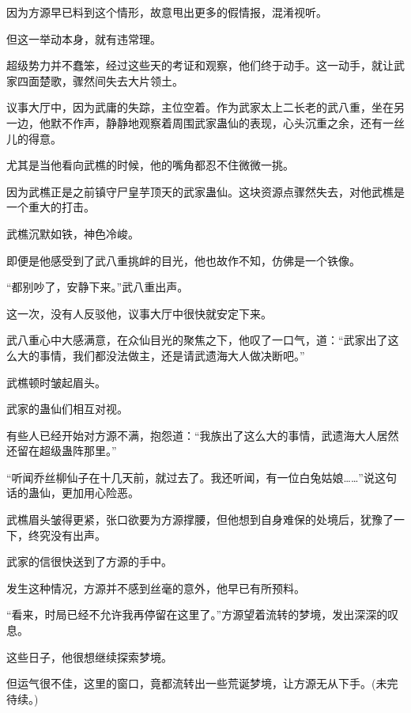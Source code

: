\begin{this_body}
因为方源早已料到这个情形，故意甩出更多的假情报，混淆视听。

但这一举动本身，就有违常理。

超级势力并不蠢笨，经过这些天的考证和观察，他们终于动手。这一动手，就让武家四面楚歌，骤然间失去大片领土。

议事大厅中，因为武庸的失踪，主位空着。作为武家太上二长老的武八重，坐在另一边，他默不作声，静静地观察着周围武家蛊仙的表现，心头沉重之余，还有一丝儿的得意。

尤其是当他看向武樵的时候，他的嘴角都忍不住微微一挑。

因为武樵正是之前镇守尸皇芋顶天的武家蛊仙。这块资源点骤然失去，对他武樵是一个重大的打击。

武樵沉默如铁，神色冷峻。

即便是他感受到了武八重挑衅的目光，他也故作不知，仿佛是一个铁像。

“都别吵了，安静下来。”武八重出声。

这一次，没有人反驳他，议事大厅中很快就安定下来。

武八重心中大感满意，在众仙目光的聚焦之下，他叹了一口气，道：“武家出了这么大的事情，我们都没法做主，还是请武遗海大人做决断吧。”

武樵顿时皱起眉头。

武家的蛊仙们相互对视。

有些人已经开始对方源不满，抱怨道：“我族出了这么大的事情，武遗海大人居然还留在超级蛊阵那里。”

“听闻乔丝柳仙子在十几天前，就过去了。我还听闻，有一位白兔姑娘……”说这句话的蛊仙，更加用心险恶。

武樵眉头皱得更紧，张口欲要为方源撑腰，但他想到自身难保的处境后，犹豫了一下，终究没有出声。

武家的信很快送到了方源的手中。

发生这种情况，方源并不感到丝毫的意外，他早已有所预料。

“看来，时局已经不允许我再停留在这里了。”方源望着流转的梦境，发出深深的叹息。

这些日子，他很想继续探索梦境。

但运气很不佳，这里的窗口，竟都流转出一些荒诞梦境，让方源无从下手。(未完待续。)

\end{this_body}

